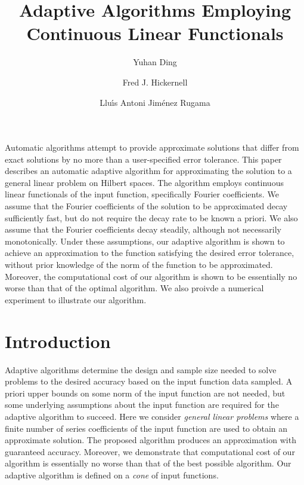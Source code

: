 \documentclass[graybox,footinfo]{svmult}
\begin{document}
\title*{Adaptive Algorithms Employing Continuous Linear Functionals}
\author{Yuhan Ding \and Fred J. Hickernell \and Llu\'{\i}s Antoni Jim\'{e}nez Rugama}

\maketitle

\abstract{}
Automatic algorithms attempt to provide approximate solutions that differ from exact solutions by no more than a user-specified error tolerance. This paper describes an automatic adaptive algorithm for approximating the solution to a general linear problem on Hilbert spaces. The algorithm employs continuous linear functionals of the input function, specifically Fourier coefficients. We assume that the Fourier coefficients of the solution to be approximated decay sufficiently fast, but do not require the decay rate to be known a priori. We also assume that the Fourier coefficients decay steadily, although not necessarily monotonically. Under these assumptions, our adaptive algorithm is shown to achieve an approximation to the function satisfying the desired error tolerance, without prior knowledge of the norm of the function to be approximated. Moreover, the computational cost of our algorithm is shown to be essentially no worse than that of the optimal algorithm. We also proivde a numerical experiment to illustrate our algorithm.



\section{Introduction}
Adaptive algorithms determine the design and sample size needed to solve problems to the desired accuracy based on the input function data sampled.  A priori upper bounds on some norm of the input function are not needed, but some underlying assumptions about the input function are required for the adaptive algorithm to succeed.  Here we consider \emph{general linear problems} where a finite number of series coefficients of the input function are used to obtain an approximate solution.  The proposed algorithm produces an approximation with guaranteed accuracy.  Moreover, we demonstrate that  computational cost of our algorithm is essentially no worse than that of the best possible algorithm.  Our adaptive algorithm is defined on a \emph{cone} of input functions.
\end{document}
